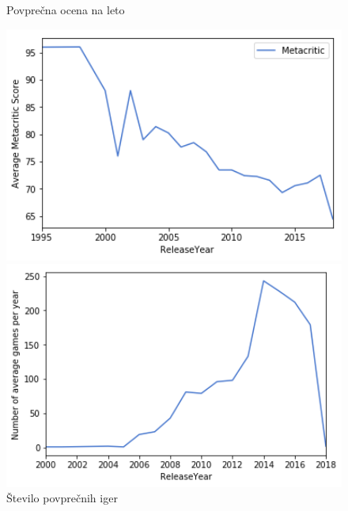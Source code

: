 \documentclass[a4paper]{article}
\begin{document}
\begin{figure}[h]
    \centering
    \begin{minipage}{0.45\textwidth}
			\centering
			\caption{Povprečna ocena na leto \label{fig:avg_r_year}}
			\includegraphics[width=1\textwidth,keepaspectratio]{fgraf_povprecna_ocena_leto.png}
    \end{minipage}\hfill
    \begin{minipage}{0.45\textwidth}
			\centering
			\caption{Število povprečnih iger \label{fig:avg_n_year}}
			\includegraphics[width=1\textwidth,keepaspectratio]{graf_PovprecneIgre_leto.png}
    \end{minipage}
\end{figure}
\end{document}
